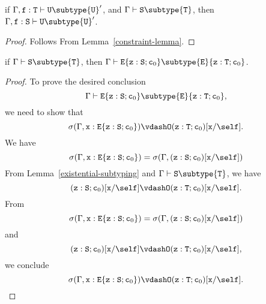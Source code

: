 \begin{lemma}
\label{subtype-lemma} %
if   $\Gamma, {\tt f}: {\tt T} \vdash {\tt U} \subtype {\tt U}'$,
and  $\Gamma \vdash {\tt S} \subtype {\tt T}$, then $\Gamma, {\tt f}: {\tt S} \vdash {\tt U} \subtype {\tt U}'$.
\end{lemma}

\begin{proof}
Follows From Lemma~\ref{constraint-lemma}.
\end{proof}

\begin{lemma}
\label{subtyping-in-existential-lemma} %
if   $\Gamma \vdash {\tt S} \subtype {\tt T}$,
then $\Gamma \vdash {\tt E}\{{\tt z}: {\tt S}; {\tt c}_0\} \subtype {\tt E}\{{\tt z}: {\tt T}; {\tt c}_0\}$.
\end{lemma}

\begin{proof}
To prove the desired conclusion 
$$\Gamma \vdash {\tt E}\{{\tt z}: {\tt S}; {\tt c}_0\} \subtype {\tt E}\{{\tt z}: {\tt T}; {\tt c}_0\},$$
we need to show that
$$\sigma(\Gamma, {\tt x}: {\tt E}\{{\tt z}: {\tt S}; {\tt c}_0\}) \vdashO ({\tt z}: {\tt T}; {\tt c}_0)[{\tt x}/\self].$$
%
We have 
$$
\sigma(\Gamma, {\tt x}: {\tt E}\{{\tt z}: {\tt S}; {\tt c}_0\})
                                                        = \sigma(\Gamma, ({\tt z}: {\tt S}; {\tt c}_0)[{\tt x}/\self])
$$
From Lemma~\ref{existential-subtyping} and
$\Gamma \vdash {\tt S} \subtype {\tt T}$, 
we have
$$({\tt z}: {\tt S}; {\tt c}_0)[{\tt x}/\self] \vdashO ({\tt z}: {\tt T}; {\tt c}_0)[{\tt x}/\self].$$
From $$
\sigma(\Gamma, {\tt x}: {\tt E}\{{\tt z}: {\tt S}; {\tt c}_0\})
                                                        = \sigma(\Gamma, ({\tt z}: {\tt S}; {\tt c}_0)[{\tt x}/\self])$$
and
$$({\tt z}: {\tt S}; {\tt c}_0)[{\tt x}/\self] \vdashO ({\tt z}: {\tt T}; {\tt c}_0)[{\tt x}/\self],$$
we conclude 
$$\sigma(\Gamma, {\tt x}: {\tt E}\{{\tt z}: {\tt S}; {\tt c}_0\}) \vdashO ({\tt z}: {\tt T}; {\tt c}_0)[{\tt x}/\self].$$
\end{proof}

